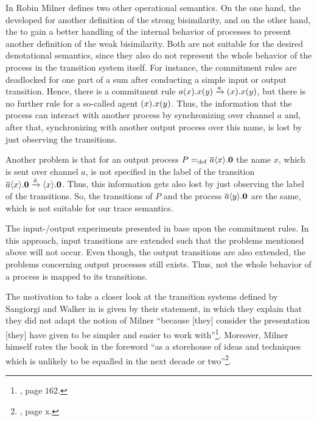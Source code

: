 In \cite{milner} Robin Milner defines two other operational semantics. On the one hand, the  developed for another definition of the strong bisimilarity, and on the other hand, the  to gain a better handling of the internal behavior of processes to present another definition of the weak bisimilarity. Both are not suitable for the desired denotational semantics, since they also do not represent the whole behavior of the process in the transition system itself. For instance, the commitment rules are deadlocked for one part of a sum after conducting a simple input or output transition. Hence, there is a commitment rule $a(x).x(y)\xrightarrow{a}(x).x(y)$, but there is no further rule for a so-called agent $(x).x(y)$. Thus, the information that the process can interact with another process by synchronizing over channel $a$ and, after that, synchronizing with another output process over this name, is lost by just observing the transitions.

Another problem is that for an output process $P=_{\mathrm{def}}\overline{a}\langle x\rangle.\mathbf{0}$ the name $x$, which is sent over channel $a$, is not specified in the label of the transition $\overline{a}\langle x\rangle.\mathbf{0} \xrightarrow{\bar{a}}\langle x\rangle.\mathbf{0}$. Thus, this information gets also lost by just observing the label of the transitions. So, the transitions of $P$ and the process $\overline{a}\langle y\rangle.\mathbf{0}$ are the same, which is not suitable for our trace semantics.

The input-/output experiments presented in \cite{milner} base upon the commitment rules. In this approach, input transitions are extended such that the problems mentioned above will not occur. Even though, the output transitions are also extended, the problems concerning output processes still exists. Thus, not the whole behavior of a process is mapped to its transitions.

The motivation to take a closer look at the transition systems defined by Sangiorgi and Walker in \cite{sangiorgi} is given by their statement, in which they explain that they did not adapt the notion of Milner ``because [they] consider the presentation [they] have given to be simpler and easier to work with''\footnote{\cite{sangiorgi}, page $162$.}. Moreover, Milner himself rates the book in the foreword ``as a storehouse of ideas and techniques which is unlikely to be equalled in the next decade or two''\footnote{\cite{sangiorgi}, page x.}.


